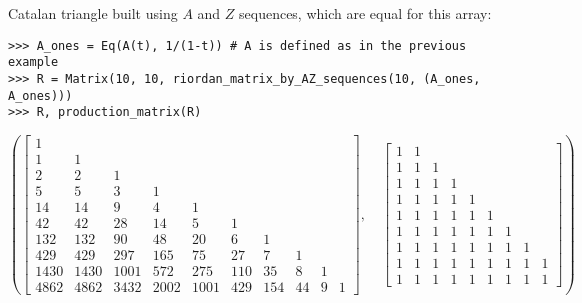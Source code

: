 \begin{example}
Catalan triangle built using $A$ and $Z$ sequences, which are equal for this array:
\begin{verbatim}
>>> A_ones = Eq(A(t), 1/(1-t)) # A is defined as in the previous example
>>> R = Matrix(10, 10, riordan_matrix_by_AZ_sequences(10, (A_ones, A_ones)))
>>> R, production_matrix(R)
\end{verbatim}
\begin{displaymath}
\left ( \left[\begin{matrix}1 &   &   &   &   &   &   &   &   &  \\1 & 1 &   &   &   &   &   &   &   &  \\2 & 2 & 1 &   &   &   &   &   &   &  \\5 & 5 & 3 & 1 &   &   &   &   &   &  \\14 & 14 & 9 & 4 & 1 &   &   &   &   &  \\42 & 42 & 28 & 14 & 5 & 1 &   &   &   &  \\132 & 132 & 90 & 48 & 20 & 6 & 1 &   &   &  \\429 & 429 & 297 & 165 & 75 & 27 & 7 & 1 &   &  \\1430 & 1430 & 1001 & 572 & 275 & 110 & 35 & 8 & 1 &  \\4862 & 4862 & 3432 & 2002 & 1001 & 429 & 154 & 44 & 9 & 1\end{matrix}\right], \quad \left[\begin{matrix}1 & 1 &   &   &   &   &   &   &  \\1 & 1 & 1 &   &   &   &   &   &  \\1 & 1 & 1 & 1 &   &   &   &   &  \\1 & 1 & 1 & 1 & 1 &   &   &   &  \\1 & 1 & 1 & 1 & 1 & 1 &   &   &  \\1 & 1 & 1 & 1 & 1 & 1 & 1 &   &  \\1 & 1 & 1 & 1 & 1 & 1 & 1 & 1 &  \\1 & 1 & 1 & 1 & 1 & 1 & 1 & 1 & 1\\1 & 1 & 1 & 1 & 1 & 1 & 1 & 1 & 1\end{matrix}\right]\right )
\end{displaymath}
\end{example}


